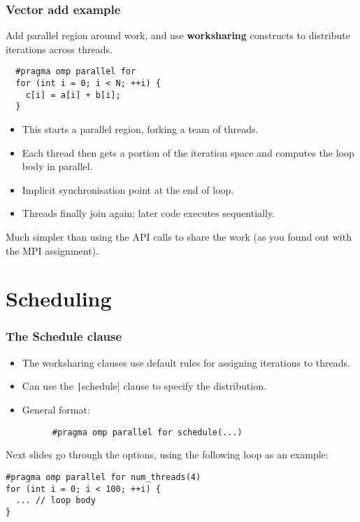 \documentclass{beamer}
\begin{document}
\begin{frame}[fragile]
\frametitle{Vector add example}
Add parallel region around work, and use {\bf worksharing} constructs to distribute iterations across threads.
\begin{verbatim}
  #pragma omp parallel for
  for (int i = 0; i < N; ++i) {
    c[i] = a[i] + b[i];
  }
\end{verbatim}
\begin{itemize}
  \item This starts a parallel region, forking a team of threads.
  \item Each thread then gets a portion of the iteration space and computes the loop body in parallel.
  \item Implicit synchronisation point at the end of loop.
  \item Threads finally join again; later code executes sequentially.
\end{itemize}

Much simpler than using the API calls to share the work (as you found out with the MPI assignment).
\end{frame}

\section{Scheduling}
\begin{frame}[fragile]
\frametitle{The Schedule clause}
\begin{itemize}
  \item The worksharing clauses use default rules for assigning iterations to threads.
  \item Can use the \texttt|schedule| clause to specify the distribution.
  \item General format:
    \begin{verbatim}
      #pragma omp parallel for schedule(...)
    \end{verbatim}
\end{itemize}
Next slides go through the options, using the following loop as an example:
\begin{verbatim}
#pragma omp parallel for num_threads(4)
for (int i = 0; i < 100; ++i) {
  ... // loop body
}
\end{verbatim}

\end{frame}
\end{document}
